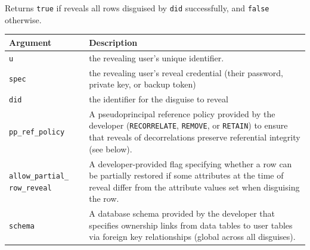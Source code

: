     Returns \texttt{true} if \sys reveals all rows disguised by \texttt{did}
successfully, and \texttt{false} otherwise.

\begin{center}
    \begin{longtable}{|m{}|m{}|}
        \hline
        \textbf{Argument} & \textbf{Description} \\
        \hline
             \texttt{u}& the revealing user's unique identifier. \\
        \hline
        \texttt{spec} & the revealing user's reveal credential (their password, private key, or
    backup token)\\
        \hline
        \texttt{did}& the identifier for the disguise to reveal\\
        \hline
        \texttt{pp\_ref\_policy} & A pseudoprincipal reference policy provided by the developer (\texttt{RECORRELATE}, \texttt{REMOVE},
    or \texttt{RETAIN}) to ensure that reveals of decorrelations preserve
        referential integrity (see below). \\
        \hline
        \texttt{allow\_partial\_} \texttt{row\_reveal}& A developer-provided flag
        specifying whether a row can be partially restored if some attributes at
            the time of reveal differ from the attribute values set when
            disguising the row.\\
        \hline
        \texttt{schema} & A database schema provided by the developer that specifies
    ownership links from data tables to user tables via foreign key
    relationships (global across all disguises).  \\
        \hline
    \end{longtable}
    \end{center}
    \vspace{-12pt}
